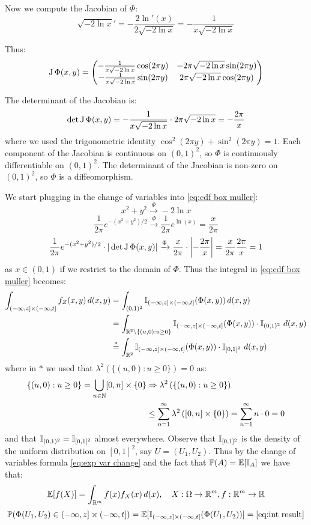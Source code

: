 Now we compute the Jacobian of $\Phi$:
\[\sqrt{-2 \ln x}'
    = -\frac{2 \ln'(x)}{2\sqrt{-2 \ln x}}
    = -\frac{1}{x\sqrt{-2 \ln x}}\]

Thus:
\[\operatorname{J} \Phi(x, y) =
    \begin{pmatrix}
        -\frac{1}{x\sqrt{-2 \ln x}} \cos(2\pi y) & -2\pi \sqrt{-2 \ln x} \sin(2\pi y) \\
        -\frac{1}{x\sqrt{-2 \ln x}} \sin(2\pi y) & 2\pi \sqrt{-2 \ln x} \cos(2\pi y)
    \end{pmatrix}\]

The determinant of the Jacobian is:
\[\det \operatorname{J} \Phi(x, y)
    = -\frac{1}{x\sqrt{-2 \ln x}} \cdot  2\pi \sqrt{-2 \ln x}
    = -\frac{2\pi}{x}\]
where we used the trigonometric identity $\cos^2(2\pi y) + \sin^2(2\pi y) = 1$. Each component of the Jacobian is continuous on $(0, 1)^2$, so $\Phi$ is continuously differentiable on $(0, 1)^2$. The determinant of the Jacobian is non-zero on $(0, 1)^2$, so $\Phi$ is a diffeomorphism.

We start plugging in the change of variables into \eqref{eq:cdf box muller}:
\[x^2 + y^2 \xrightarrow{\Phi} -2 \ln x\]
\[\frac{1}{2\pi} e^{-(x^2 + y^2) / 2}
    \xrightarrow{\Phi} \frac{1}{2\pi} e^{\ln(x)}
    = \frac{x}{2\pi}\]
\[\frac{1}{2\pi} e^{-(x^2 + y^2) / 2} \cdot |\det \operatorname{J} \Phi(x, y)|
    \xrightarrow{\Phi} \frac{x}{2\pi} \cdot \left|-\frac{2\pi}{x} \right|
    = \frac{x}{2\pi} \frac{2\pi}{x}
    = 1\]
as $x \in (0, 1)$ if we restrict to the domain of $\Phi$. Thus the integral in \eqref{eq:cdf box muller} becomes:
\begin{align}
    \int_{(-\infty,z] \times (-\infty,t]} f_Z(x,y) \, d(x, y)
     & = \int_{(0, 1)^2} \operatorname{\mathbb{I}}_{(-\infty,z] \times (-\infty,t]}(\Phi(x, y)) \, d(x, y) \notag
    \\ &= \int_{\mathbb{R}^2 \setminus \{(u, 0): u \geq 0\}} \operatorname{\mathbb{I}}_{(-\infty,z] \times (-\infty,t]}(\Phi(x, y)) \cdot \operatorname{\mathbb{I}}_{(0, 1)^2} \, d(x, y) \notag
    \\ &\overset{*}{=} \int_{\mathbb{R}^2} \operatorname{\mathbb{I}}_{(-\infty,z] \times (-\infty,t]}(\Phi(x, y)) \cdot \operatorname{\mathbb{I}}_{[0, 1]^2} \, d(x, y) \label{eq:int result}
\end{align}
where in $*$ we used that $\lambda^2 \left(\{(u, 0): u \geq 0\} \right) = 0$ as:
\begin{align*}
    \{(u, 0): u \geq 0\}
    = \bigcup_{n \in \mathbb{N}} [0, n] \times \{0\}
     & \Rightarrow \lambda^2 \left(\{(u, 0): u \geq 0\} \right)
    \\ &\leq \sum_{n=1}^{\infty} \lambda^2 \left([0, n] \times \{0\}\right)
    = \sum_{n=1}^{\infty} n \cdot 0
    = 0
\end{align*}
and that $\operatorname{\mathbb{I}}_{(0, 1)^2} = \operatorname{\mathbb{I}}_{[0, 1]^2}$ almost everywhere. Observe that $\operatorname{\mathbb{I}}_{[0, 1]^2}$ is the density of the uniform distribution on $[0, 1]^2$, say $U = (U_1, U_2)$. Thus by the change of variables formula \eqref{eq:exp var change} and the fact that $\operatorname{\mathbb{P}}(A) = \operatorname{\mathbb{E}}[\operatorname{\mathbb{I}}_A]$ we have that:
\begin{equation} \label{eq:exp var change}
    \operatorname{\mathbb{E}}[f(X)] = \int_{\mathbb{R}^m} f(x) f_X(x) \, d(x), \quad X:\Omega \to \mathbb{R}^m, f:\mathbb{R}^m \to \mathbb{R}
\end{equation}
\[\operatorname{\mathbb{P}}(\Phi(U_1, U_2) \in (-\infty,z] \times (-\infty, t])
    = \operatorname{\mathbb{E}} [\operatorname{\mathbb{I}}_{(-\infty,z] \times (-\infty, t]}(\Phi(U_1, U_2))]
    = \eqref{eq:int result}\]


